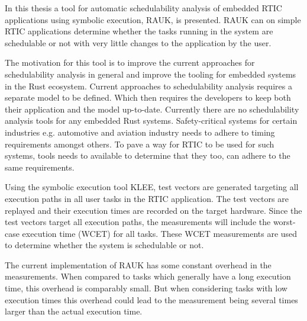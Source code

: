 In this thesis a tool for automatic schedulability analysis of embedded RTIC
applications using symbolic execution, RAUK, is presented. RAUK can
on simple RTIC applications determine whether the tasks running in the
system are schedulable or not with very little changes to the application
by the user.

The motivation for this tool is to improve the current approaches for
schedulability analysis in general and improve the tooling for embedded
systems in the Rust ecosystem. Current approaches to schedulability
analysis requires a separate model to be defined. Which then requires
the developers to keep both their application and the model up-to-date.
Currently there are no schedulability analysis tools for any embedded Rust
systems. Safety-critical systems for certain industries e.g. automotive and
aviation industry needs to adhere to timing requirements amongst others. To
pave a way for RTIC to be used for such systems, tools needs to available to
determine that they too, can adhere to the same requirements.

Using the symbolic execution tool KLEE, test vectors are generated targeting
all execution paths in all user tasks in the RTIC application. The test vectors
are replayed and their execution times are recorded on the target hardware.
Since the test vectors target all execution paths, the measurements will
include the worst-case execution time (WCET) for all tasks. These WCET
measurements are used to determine whether the system is schedulable or not.

The current implementation of RAUK has some constant overhead in the
measurements. When compared to tasks which generally have a long execution
time, this overhead is comparably small. But when considering tasks
with low execution times this overhead could lead to the measurement
being several times larger than the actual execution time.
